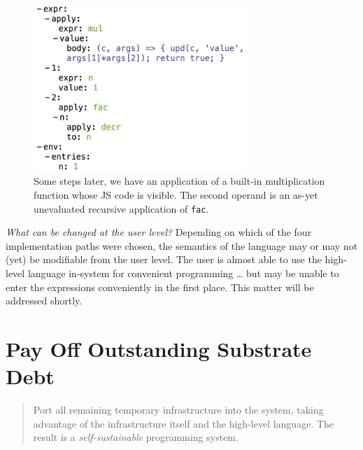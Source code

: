 \documentclass[ twoside,openright,titlepage,numbers=noenddot,headinclude,footinclude,cleardoublepage=empty,abstract=on,
                BCOR=5mm,paper=a4,fontsize=11pt
                ]{scrreprt}
\newcommand{\note}[1]{}
\theoremstyle{definition}
\begin{document}
\begin{figure}
\centering
\includegraphics[width=8cm]{masp/4-apply-mul.png}
\caption[Masp Factorial evaluation step 4]{Some steps later, we have an application of a built-in multiplication function whose JS code is visible. The second operand is an as-yet unevaluated recursive application of \texttt{fac}.}
\label{fig:masp-n}
\end{figure}

\note{Perhaps the idea of bootstrapping abstractions from the low-level (Heuristic\ \ref{use-asm}) has been refuted? Instead of writing BL-ASM in-system to build things up, it's been so tedious that I haven't touched it and instead leaped to Masp in JavaScript! It is of course still possible in principle, but the complex reality of how I did things and the design decisions I made, caused it to be uneconomical.}

\emph{What can be changed at the user level?} Depending on which of the
four implementation paths were chosen, the semantics of the language may
or may not (yet) be modifiable from the user level. The user is almost
able to use the high-level language in-system for convenient programming
\ldots{} but may be unable to enter the expressions conveniently in the
first place. This matter will be addressed shortly.

\hypertarget{pay-off-outstanding-substrate-debt}{\section{Pay Off Outstanding Substrate
Debt}\label{pay-off-outstanding-substrate-debt}}

\begin{quote}
Port all remaining temporary infrastructure into the system, taking
advantage of the infrastructure itself and the high-level language. The
result is a \emph{self-sustainable} programming system.
\end{quote}
\end{document}
